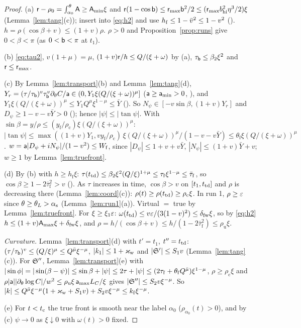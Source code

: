 \begin{proof}
(a) $\mathsf r-\rho_0=\int_{\alpha_0}^\theta\mathsf A\ge\mathsf A_{\min}\xi$ and $\mathsf r(1-\cos\mathsf b)\le\mathsf r_{\max}\mathsf b^2/2\le(\mathsf r_{\max}b_{\mathrm{hi}}^2\eta^3/2)\xi$
(Lemma~\ref{lem:tang}(c)); insert into \eqref{eq:h2} and use $h_{\mathrm f}\le1-\bar v^2\le1-v^2$ (). $h=\rho(\cos\beta+v)\le(1+v)\rho$.
$\rho>0$ and Proposition~\ref{prop:runs} give $0<\beta<\pi$ (as $0<\mathsf b<\pi$ at $t_1$).

(b) \eqref{eq:tau2}, $v(1+\mu)=\mu$, $(1+v)\mathsf r/h\le Q/(\xi+\omega)$ by (a), $\tau_{\mathsf b}\le\beta_2\xi^2$ and $\mathsf r\le\mathsf r_{\max}$.

(c) By Lemma~\ref{lem:transport}(b) and Lemma~\ref{lem:tang}(d), $Y_r=(\tau/\tau_{\mathsf b})^v\tau_{\mathsf b}^v\partial_\theta C/\mathsf a\in(0,Y_1\xi(Q/(\xi+\omega))^\mu]$
($\mathsf a\ge\mathsf a_{\min}>0$, ), and $Y_1\xi(Q/(\xi+\omega))^\mu\le Y_1Q^\mu\xi^{1-\mu}\le\bar Y$ (). So
$N_\psi\in[-v\sin\beta,(1+v)Y_r]$ and $D_\psi\ge1-v-v\bar Y>0$ (); hence $|\psi|\le|\tan\psi|$. With
$\sin\beta=y/\rho\le(y_{\mathrm f}/\rho_{\mathrm c})\xi(Q/(\xi+\omega))^\mu$:
$|\tan\psi|\le\max((1+v)Y_1,vy_{\mathrm f}/\rho_{\mathrm c})\,\xi(Q/(\xi+\omega))^\mu/(1-v-v\bar Y)\le\theta_{\mathrm f}\xi(Q/(\xi+\omega))^\mu$.
$w=\mathsf a|D_\psi+iN_\psi|/(1-v^2)\le W_{\mathrm f}$, since $|D_\psi|\le1+v+v\bar Y$, $|N_\psi|\le(1+v)\bar Y+v$; $w\ge1$ by Lemma~\ref{lem:truefront}.

(d) By (b) with $h\ge h_{\mathrm f}\xi$: $\tau(t_{\mathrm{td}})\le\beta_2\xi^2(Q/\xi)^{1+\mu}\le\tau_{\mathrm f}\xi^{1-\mu}\le\bar\tau_{\mathrm f}$, so
$\cos\beta\ge1-2\bar\tau_{\mathrm f}^2>v$ (). As $\tau$ increases in time, $\cos\beta>v$ on $[t_1,t_{\mathrm{td}}]$ and $\rho$ is
decreasing there (Lemma~\ref{lem:coord}(c)): $\rho(t)\ge\rho(t_{\mathrm{td}})\ge\rho_{\mathrm c}\xi$. In run 1, $\rho\ge\varepsilon$ since
$\theta\ge\theta_L>\alpha_{\mathrm s}$ (Lemma~\ref{lem:run1}(a)). Virtual $=$ true by Lemma~\ref{lem:truefront}. For $\xi\ge\xi_1\varepsilon$:
$\omega(t_{\mathrm{td}})\le v\varepsilon/(3(1-v)^2)\le\delta_{\mathrm{fw}}\xi$, so by \eqref{eq:h2} $h\le(1+v)\mathsf A_{\max}\xi+\delta_{\mathrm{fw}}\xi$, and
$\rho=h/(\cos\beta+v)\le h/(1-2\bar\tau_{\mathrm f}^2)\le\rho_{\mathrm u}\xi$.

\emph{Curvature.} Lemma~\ref{lem:transport}(d) with $t'=t_1$, $t''=t_{\mathrm{td}}$: $(\tau/\tau_{\mathsf b})^v\le(Q/\xi)^\mu\le Q^{\bar\mu}\xi^{-\mu}$,
$|k_1|\le1+\varkappa_{\mathrm w}$ and $|\mathfrak S'|\le S_1v$ (Lemma~\ref{lem:tang}(c)). For $\mathfrak S''$, Lemma~\ref{lem:transport}(e) with
$|\sin\phi|=|\sin(\beta-\psi)|\le\sin\beta+|\psi|\le2\tau+|\psi|\le(2\tau_{\mathrm f}+\theta_{\mathrm f}Q^{\bar\mu})\xi^{1-\mu}$,
$\rho\ge\rho_{\mathrm c}\xi$ and $\rho|\mathsf a||\partial_\theta\log C|/w^2\le\rho_{\mathrm u}\xi\,\mathsf a_{\max}L_C/\xi$ gives $|\mathfrak S''|\le S_2v\xi^{-\mu}$.
So $|k|\le Q^{\bar\mu}\xi^{-\mu}(1+\varkappa_{\mathrm w}+S_1v)+S_2v\xi^{-\mu}\le k_{\mathrm f}\xi^{-\mu}$.

(e) For $t<t_{\mathrm c}$ the true front is smooth near the label $\alpha_0$ ($\rho_{\alpha_0}(t)>0$), and by (c) $\psi\to0$ as $\xi\downarrow0$ with
$\omega(t)>0$ fixed.
\end{proof}

